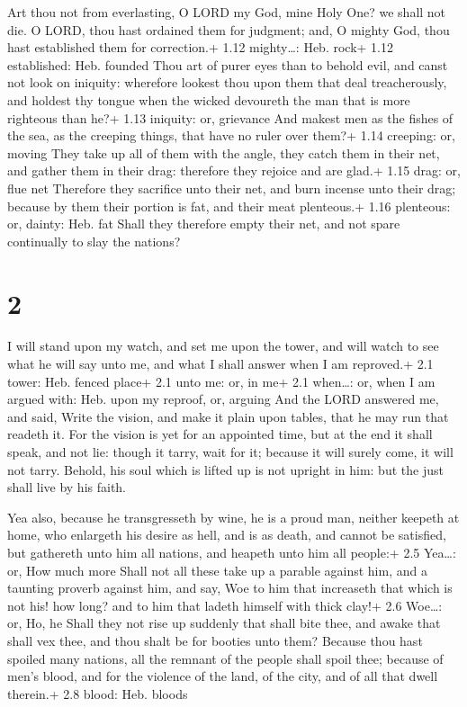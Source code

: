  Art thou not from everlasting, O LORD my God, mine Holy
One? we shall not die. O LORD, thou hast ordained them for judgment;
and, O mighty God, thou hast established them for correction.+ 1.12
mighty\ldots: Heb. rock+ 1.12 established: Heb. founded 
Thou art of purer eyes than to behold evil, and canst not look on
iniquity: wherefore lookest thou upon them that deal treacherously, and
holdest thy tongue when the wicked devoureth the man that is more
righteous than he?+ 1.13 iniquity: or, grievance  And
makest men as the fishes of the sea, as the creeping things, that have
no ruler over them?+ 1.14 creeping: or, moving  They take
up all of them with the angle, they catch them in their net, and gather
them in their drag: therefore they rejoice and are glad.+ 1.15 drag: or,
flue net  Therefore they sacrifice unto their net, and burn
incense unto their drag; because by them their portion is fat, and their
meat plenteous.+ 1.16 plenteous: or, dainty: Heb. fat 
Shall they therefore empty their net, and not spare continually to slay
the nations?

\hypertarget{section-1}{%
\section{2}\label{section-1}}

 I will stand upon my watch, and set me upon the tower, and
will watch to see what he will say unto me, and what I shall answer when
I am reproved.+ 2.1 tower: Heb. fenced place+ 2.1 unto me: or, in me+
2.1 when\ldots: or, when I am argued with: Heb. upon my reproof, or,
arguing  And the LORD answered me, and said, Write the
vision, and make it plain upon tables, that he may run that readeth it.
 For the vision is yet for an appointed time, but at the end
it shall speak, and not lie: though it tarry, wait for it; because it
will surely come, it will not tarry.  Behold, his soul which
is lifted up is not upright in him: but the just shall live by his
faith.

 Yea also, because he transgresseth by wine, he is a proud
man, neither keepeth at home, who enlargeth his desire as hell, and is
as death, and cannot be satisfied, but gathereth unto him all nations,
and heapeth unto him all people:+ 2.5 Yea\ldots: or, How much more
 Shall not all these take up a parable against him, and a
taunting proverb against him, and say, Woe to him that increaseth that
which is not his! how long? and to him that ladeth himself with thick
clay!+ 2.6 Woe\ldots: or, Ho, he  Shall they not rise up
suddenly that shall bite thee, and awake that shall vex thee, and thou
shalt be for booties unto them?  Because thou hast spoiled
many nations, all the remnant of the people shall spoil thee; because of
men's blood, and for the violence of the land, of the city, and of all
that dwell therein.+ 2.8 blood: Heb. bloods

